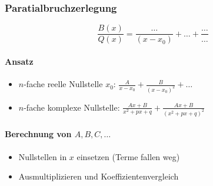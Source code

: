 \documentclass[german]{latex4ei/latex4ei_sheet}
\begin{document}
\begin{sectionbox}
    \subsubsection{Paratialbruchzerlegung}
    \begin{equation*}
    \frac{B(x)}{Q(x)} = \frac{\ldots}{(x - x_0)} + \ldots + \frac{\ldots}{\ldots}
    \end{equation*}
    \paragraph{Ansatz}
    \begin{itemize}\itemsep0pt
    \item $n$-fache reelle Nullstelle $x_0$: $\frac{A}{x-x_0}+\frac{B}{(x-x_0)^2} +\dots$
    \item $n$-fache komplexe Nullstelle: $\frac{Ax+B}{x^2+px+q}+\frac{Ax+B}{(x^2+px+q)^2}$
    \end{itemize}
    \paragraph{Berechnung von $A,B,C,\dots$}
    \begin{itemize}\itemsep0pt
    \item Nullstellen in $x$ einsetzen (Terme fallen weg)
    \item Ausmultiplizieren und Koeffizientenvergleich
    \end{itemize}
    
    
\end{sectionbox}

\end{document}

